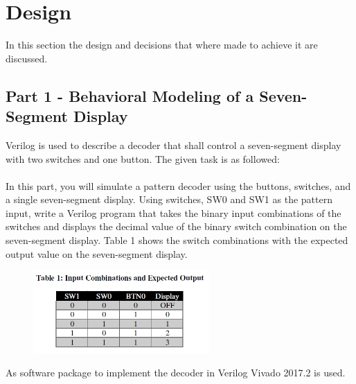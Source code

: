\section{Design}\label{sec: Design}
In this section the design and decisions that where made to achieve it are discussed.

\subsection{Part 1 - Behavioral Modeling of a Seven-Segment Display}\label{sub: Behavioral Modeling of a Seven-Segment Display}
Verilog is used to describe a decoder that shall control a seven-segment display with two switches and one button. The given task is as followed:
\\
\\
In this part, you will simulate a pattern decoder using the buttons, switches, and a single seven-segment display.
Using switches, SW0 and SW1 as the pattern input, write a Verilog program that takes the binary input
combinations of the switches and displays the decimal value of the binary switch combination on the seven-segment
display. Table 1 shows the switch combinations with the expected output value on the seven-segment
display.

\begin{figure}[htbp]
	\centering
	\includegraphics[width=0.6\textwidth]{01_images/Vivado_lab2_part1_table1.png}
	\label{fig: Vivado_lab2_part1_table1}
\end{figure}

As software package to implement the decoder in Verilog Vivado 2017.2 is used. 

